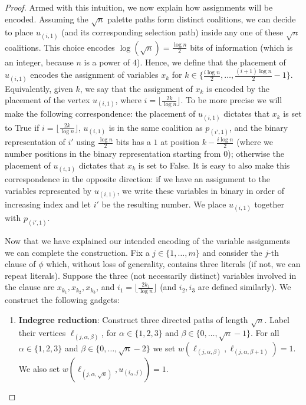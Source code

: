 \documentclass[letterpaper,USenglish,cleveref, autoref, thm-restate]{lipics-v2021}
\begin{document}
\begin{proof}
Armed with this intuition, we now explain how assignments will be encoded.
Assuming the $\sqrt{n}$ palette paths form distinct coalitions, we can decide
to place $u_{(i,1)}$ (and its corresponding selection path) inside any one of
these $\sqrt{n}$ coalitions. This choice encodes $\log(\sqrt{n})=\frac{\log
n}{2}$ bits of information (which is an integer, because $n$ is a power of
$4$). Hence, we define that the placement of $u_{(i,1)}$ encodes the assignment
of variables $x_k$ for $k\in\{\frac{i\log n}{2},\ldots, \frac{(i+1)\log
n}{2}-1\}$. Equivalently, given $k$, we say that the assignment of $x_k$ is
encoded by the placement of the vertex $u_{(i,1)}$, where $i=\lfloor
\frac{2k}{\log n}\rfloor$. To be more precise we will make the following
correspondence: the placement of $u_{(i,1)}$ dictates that $x_k$ is set to True
if $i=\lfloor \frac{2k}{\log n}\rfloor$, $u_{(i,1)}$ is in the same coalition
as $p_{(i',1)}$, and the binary representation of $i'$ using $\frac{\log n}{2}$
bits has a $1$ at position $k-\frac{i\log n}{2}$ (where we number positions in
the binary representation starting from $0$); otherwise the placement of
$u_{(i,1)}$ dictates that $x_k$ is set to False. It is easy to also make this
correspondence in the opposite direction: if we have an assignment to the
variables represented by $u_{(i,1)}$, we write these variables in binary in
order of increasing index and let $i'$ be the resulting number. We place
$u_{(i,1)}$ together with $p_{(i',1)}$.

Now that we have explained our intended encoding of the variable assignments we
can complete the construction. Fix a $j\in\{1,\ldots,m\}$ and consider the
$j$-th clause of $\phi$ which, without loss of generality, contains three
literals (if not, we can repeat literals). Suppose the three (not necessarily
distinct) variables involved in the clause are $x_{k_1}, x_{k_2}, x_{k_3}$, and
$i_1=\lfloor \frac{2k_1}{\log n}\rfloor$ (and $i_2,i_3$ are defined similarly).
We construct the following gadgets:

\begin{enumerate}

\item \textbf{Indegree reduction}: Construct three directed paths of length
$\sqrt{n}$.  Label their vertices $\ell_{(j,\alpha,\beta)}$, for
$\alpha\in\{1,2,3\}$ and $\beta\in\{0,\ldots,\sqrt{n}-1\}$. For all
$\alpha\in\{1,2,3\}$ and $\beta\in\{0,\ldots,\sqrt{n}-2\}$ we set
$w(\ell_{(j,\alpha,\beta)}, \ell_{(j,\alpha,\beta+1)})=1$. We also set
$w(\ell_{(j,\alpha,\sqrt{n})},u_{(i_{\alpha},j)})=1$. 


\end{enumerate}
\end{proof}
\end{document}
